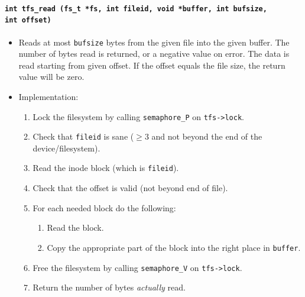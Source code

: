 \documentclass[twoside,a4paper]{report}
\makeatletter
\newenvironment{function}[3]{%
\paragraph{\texttt{#1 {\textbf{#2}} (#3)}}%
\index{#2@\texttt{#2}}%
\begin{itemize}%
}{%
\end{itemize}%
}
\newcommand{\brtab}{\\\hspace*{1cm}}
\makeatother
\begin{document}
\begin{function}{int}{tfs\_read}{fs\_t *fs, int fileid, void *buffer, int bufsize,\brtab int offset}

\item Reads at most \texttt{bufsize} bytes from the given file into
the given buffer. The number of bytes read is returned, or a negative
value on error. The data is read starting from given offset. If the
offset equals the file size, the return value will be zero.

\item Implementation:
\begin{enumerate}
\item Lock the filesystem by calling \texttt{semaphore\_P} on
\texttt{tfs->lock}.
\item Check that \texttt{fileid} is sane ($\ge3$ and not beyond the
end of the device/filesystem).
\item Read the inode block (which is \texttt{fileid}).
\item Check that the offset is valid (not beyond end of file).
\item For each needed block do the following:
  \begin{enumerate}
  \item Read the block.
  \item Copy the appropriate part of the block into the right place in
  \texttt{buffer}.
  \end{enumerate}
\item Free the filesystem by calling \texttt{semaphore\_V} on
\texttt{tfs->lock}.
\item Return the number of bytes \emph{actually} read.
\end{enumerate}

\end{function}
\end{document}
